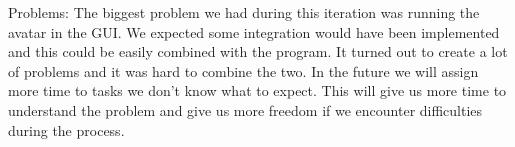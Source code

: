 Problems:
The biggest problem we had during this iteration was running the avatar in the GUI. We expected some integration would have been implemented and this could be easily combined with the program. It turned out to create a lot of problems and it was hard to combine the two. 
In the future we will assign more time to tasks we don’t know what to expect. This will give us more time to understand the problem and give us more freedom if we encounter difficulties during the process. 


